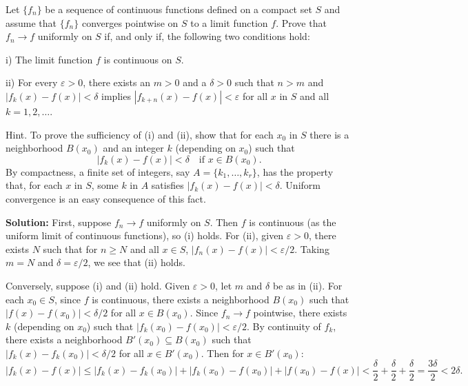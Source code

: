 \begin{problembox}
Let \( \{f_n\} \) be a sequence of continuous functions defined on a compact set \( S \) and assume that \( \{f_n\} \) converges pointwise on \( S \) to a limit function \( f \). Prove that \( f_n \to f \) uniformly on \( S \) if, and only if, the following two conditions hold:

i) The limit function \( f \) is continuous on \( S \).

ii) For every \( \varepsilon > 0 \), there exists an \( m > 0 \) and a \( \delta > 0 \) such that \( n > m \) and \( |f_k(x) - f(x)| < \delta \) implies \( |f_{k+n}(x) - f(x)| < \varepsilon \) for all \( x \) in \( S \) and all \( k = 1, 2, \ldots \).

Hint. To prove the sufficiency of (i) and (ii), show that for each \( x_0 \) in \( S \) there is a neighborhood \( B(x_0) \) and an integer \( k \) (depending on \( x_0 \)) such that
\[|f_k(x) - f(x)| < \delta \quad \text{if } x \in B(x_0).\]
By compactness, a finite set of integers, say \( A = \{k_1, \ldots, k_r\} \), has the property that, for each \( x \) in \( S \), some \( k \) in \( A \) satisfies \( |f_k(x) - f(x)| < \delta \). Uniform convergence is an easy consequence of this fact.
\end{problembox}

\noindent\textbf{Solution:} First, suppose \( f_n \to f \) uniformly on \( S \). Then \( f \) is continuous (as the uniform limit of continuous functions), so (i) holds. For (ii), given \( \varepsilon > 0 \), there exists \( N \) such that for \( n \geq N \) and all \( x \in S \), \( |f_n(x) - f(x)| < \varepsilon/2 \). Taking \( m = N \) and \( \delta = \varepsilon/2 \), we see that (ii) holds.

Conversely, suppose (i) and (ii) hold. Given \( \varepsilon > 0 \), let \( m \) and \( \delta \) be as in (ii). For each \( x_0 \in S \), since \( f \) is continuous, there exists a neighborhood \( B(x_0) \) such that \( |f(x) - f(x_0)| < \delta/2 \) for all \( x \in B(x_0) \). Since \( f_n \to f \) pointwise, there exists \( k \) (depending on \( x_0 \)) such that \( |f_k(x_0) - f(x_0)| < \varepsilon/2 \). By continuity of \( f_k \), there exists a neighborhood \( B'(x_0) \subseteq B(x_0) \) such that \( |f_k(x) - f_k(x_0)| < \delta/2 \) for all \( x \in B'(x_0) \). Then for \( x \in B'(x_0) \):
\[|f_k(x) - f(x)| \leq |f_k(x) - f_k(x_0)| + |f_k(x_0) - f(x_0)| + |f(x_0) - f(x)| < \frac{\delta}{2} + \frac{\delta}{2} + \frac{\delta}{2} = \frac{3\delta}{2} < 2\delta.\]

